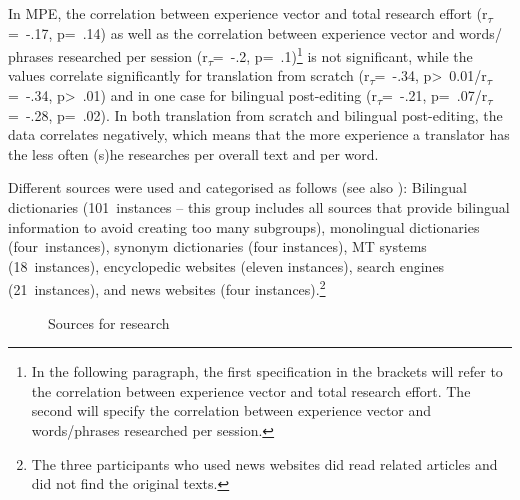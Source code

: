 \documentclass[output=paper]{langsci/langscibook}
\begin{document}
In MPE, the correlation between experience vector and total research effort (r\textsubscript{$\tau $}=~-.17,\textsubscript{ }p=~.14) as well as the correlation between experience vector and words/ phrases researched per session (r\textsubscript{$\tau $}=~-.2,\textsubscript{ }p=~.1)\footnote{In the following paragraph, the first specification in the brackets will refer to the correlation between experience vector and total research effort. The second will specify the correlation between experience vector and words/phrases researched per session.} is not significant, while the values correlate significantly for translation from scratch (r\textsubscript{$\tau $}=~-.34, p{\textgreater}~0.01/r\textsubscript{$\tau $}=~-.34, p{\textgreater}~.01) and in one case for bilingual post-editing (r\textsubscript{$\tau $}=~-.21, p=~.07/r\textsubscript{$\tau $}=~-.28, p=~.02). In both translation from scratch and bilingual post-editing, the data correlates negatively, which means that the more experience a translator has the less often (s)he researches per overall text and per word. 



Different sources were used and categorised as follows (see also ): Bilingual dictionaries (101~instances -- this group includes all sources that provide bilingual information to avoid creating too many subgroups), monolingual dictionaries (four~instances), synonym dictionaries (four instances), MT systems (18~instances), encyclopedic websites (eleven instances), search engines (21~instances), and news websites (four instances).\footnote{The three participants who used news websites did read related articles and did not find the original texts.}


 
\begin{figure} 



 \caption{Sources for research}
 \label{nitzke:fig:1}
\end{figure} 
\end{document}
